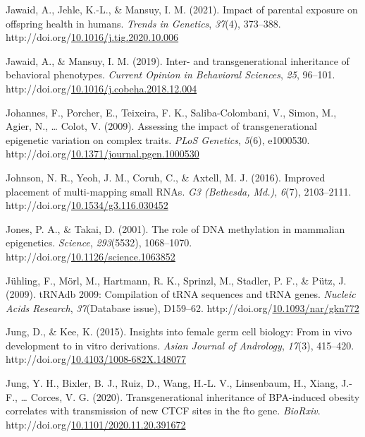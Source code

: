 \documentclass[12pt,twoside]{reedthesis}
\newlength{\cslhangindent}
\newenvironment{CSLReferences}[2] %
 {%
  \setlength{\parindent}{0pt}
  \ifodd #1 \everypar{\setlength{\hangindent}{\cslhangindent}}\ignorespaces\fi
  \ifnum #2 > 0
  \setlength{\parskip}{#2\baselineskip}
  \fi
 }%
 {}
\begin{document}
\begin{CSLReferences}{1}{0}
\leavevmode{}%
Jawaid, A., Jehle, K.-L., \& Mansuy, I. M. (2021). Impact of parental exposure on offspring health in humans. \emph{Trends in Genetics}, \emph{37}(4), 373--388. http://doi.org/\href{https://doi.org/10.1016/j.tig.2020.10.006}{10.1016/j.tig.2020.10.006}

\leavevmode{}%
Jawaid, A., \& Mansuy, I. M. (2019). Inter- and transgenerational inheritance of behavioral phenotypes. \emph{Current Opinion in Behavioral Sciences}, \emph{25}, 96--101. http://doi.org/\href{https://doi.org/10.1016/j.cobeha.2018.12.004}{10.1016/j.cobeha.2018.12.004}

\leavevmode{}%
Johannes, F., Porcher, E., Teixeira, F. K., Saliba-Colombani, V., Simon, M., Agier, N., \ldots{} Colot, V. (2009). Assessing the impact of transgenerational epigenetic variation on complex traits. \emph{PLoS Genetics}, \emph{5}(6), e1000530. http://doi.org/\href{https://doi.org/10.1371/journal.pgen.1000530}{10.1371/journal.pgen.1000530}

\leavevmode{}%
Johnson, N. R., Yeoh, J. M., Coruh, C., \& Axtell, M. J. (2016). Improved placement of multi-mapping small RNAs. \emph{G3 (Bethesda, Md.)}, \emph{6}(7), 2103--2111. http://doi.org/\href{https://doi.org/10.1534/g3.116.030452}{10.1534/g3.116.030452}

\leavevmode{}%
Jones, P. A., \& Takai, D. (2001). The role of DNA methylation in mammalian epigenetics. \emph{Science}, \emph{293}(5532), 1068--1070. http://doi.org/\href{https://doi.org/10.1126/science.1063852}{10.1126/science.1063852}

\leavevmode{}%
Jühling, F., Mörl, M., Hartmann, R. K., Sprinzl, M., Stadler, P. F., \& Pütz, J. (2009). tRNAdb 2009: Compilation of tRNA sequences and tRNA genes. \emph{Nucleic Acids Research}, \emph{37}(Database issue), D159--62. http://doi.org/\href{https://doi.org/10.1093/nar/gkn772}{10.1093/nar/gkn772}

\leavevmode{}%
Jung, D., \& Kee, K. (2015). Insights into female germ cell biology: From in vivo development to in vitro derivations. \emph{Asian Journal of Andrology}, \emph{17}(3), 415--420. http://doi.org/\href{https://doi.org/10.4103/1008-682X.148077}{10.4103/1008-682X.148077}

\leavevmode{}%
Jung, Y. H., Bixler, B. J., Ruiz, D., Wang, H.-L. V., Linsenbaum, H., Xiang, J.-F., \ldots{} Corces, V. G. (2020). Transgenerational inheritance of BPA-induced obesity correlates with transmission of new CTCF sites in the fto gene. \emph{BioRxiv}. http://doi.org/\href{https://doi.org/10.1101/2020.11.20.391672}{10.1101/2020.11.20.391672}


\end{CSLReferences}
\end{document}
